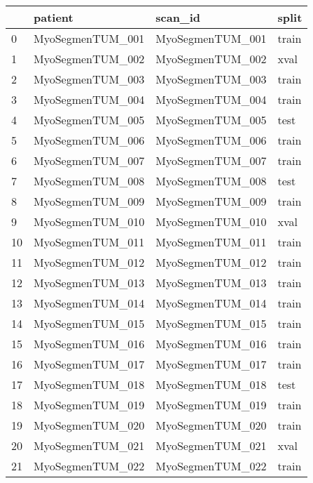 \begin{SCtable}[\sidecaptionrelwidth][h]
 
    \begin{tabular}{l m{4cm} m{4cm} l}
        \toprule
        {} &           patient &           scan\_id &  split \\
        \midrule
        0  &  MyoSegmenTUM\_001 &  MyoSegmenTUM\_001 &  train \\
        1  &  MyoSegmenTUM\_002 &  MyoSegmenTUM\_002 &   xval \\
        2  &  MyoSegmenTUM\_003 &  MyoSegmenTUM\_003 &  train \\
        3  &  MyoSegmenTUM\_004 &  MyoSegmenTUM\_004 &  train \\
        4  &  MyoSegmenTUM\_005 &  MyoSegmenTUM\_005 &   test \\
        5  &  MyoSegmenTUM\_006 &  MyoSegmenTUM\_006 &  train \\
        6  &  MyoSegmenTUM\_007 &  MyoSegmenTUM\_007 &  train \\
        7  &  MyoSegmenTUM\_008 &  MyoSegmenTUM\_008 &   test \\
        8  &  MyoSegmenTUM\_009 &  MyoSegmenTUM\_009 &  train \\
        9  &  MyoSegmenTUM\_010 &  MyoSegmenTUM\_010 &   xval \\
        10 &  MyoSegmenTUM\_011 &  MyoSegmenTUM\_011 &  train \\
        11 &  MyoSegmenTUM\_012 &  MyoSegmenTUM\_012 &  train \\
        12 &  MyoSegmenTUM\_013 &  MyoSegmenTUM\_013 &  train \\
        13 &  MyoSegmenTUM\_014 &  MyoSegmenTUM\_014 &  train \\
        14 &  MyoSegmenTUM\_015 &  MyoSegmenTUM\_015 &  train \\
        15 &  MyoSegmenTUM\_016 &  MyoSegmenTUM\_016 &  train \\
        16 &  MyoSegmenTUM\_017 &  MyoSegmenTUM\_017 &  train \\
        17 &  MyoSegmenTUM\_018 &  MyoSegmenTUM\_018 &   test \\
        18 &  MyoSegmenTUM\_019 &  MyoSegmenTUM\_019 &  train \\
        19 &  MyoSegmenTUM\_020 &  MyoSegmenTUM\_020 &  train \\
        20 &  MyoSegmenTUM\_021 &  MyoSegmenTUM\_021 &   xval \\
        21 &  MyoSegmenTUM\_022 &  MyoSegmenTUM\_022 &  train \\

\end{tabular}
\end{SCtable}
